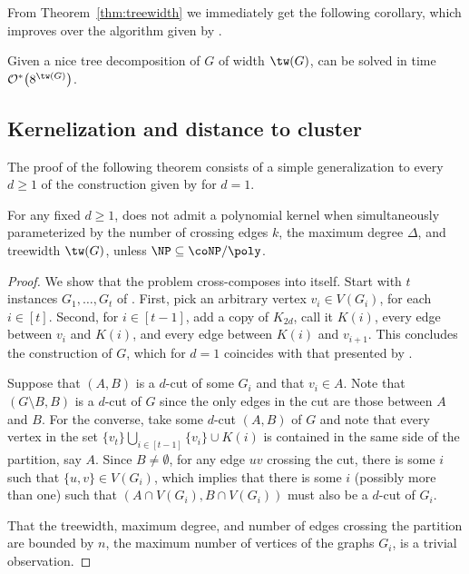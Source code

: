 From Theorem~\ref{thm:treewidth} we immediately get the following corollary, which improves over the algorithm given by \cite{matching_cut_structural}.

\begin{corollary}
   Given a nice tree decomposition of $G$ of width $\tw(G)$,  can be solved in time  $\bigOs{8^{\tw(G)}}$.
\end{corollary}

\subsection{Kernelization and distance to cluster}
\label{sec:kernelization}

The proof of the following theorem consists of a simple generalization to every $d \geq 1$ of the construction given by \cite{matching_cut_ipec}  for $d=1$.

\begin{theorem}\label{thm:no-kernel}
    For any fixed $d \geq 1$,  does not admit a polynomial kernel when simultaneously parameterized by the number of crossing edges $k$, the maximum degree $\Delta$, and treewidth $\tw(G)$, unless $\NP \subseteq \coNP/\poly$.
\end{theorem}

\begin{proof}
    We show that the problem cross-composes into itself.
    Start with $t$ instances $G_1, \dots, G_t$ of .
    First, pick an arbitrary vertex $v_i \in V(G_i)$, for each $i \in [t]$.
    Second, for $i \in [t-1]$,  add a copy of $K_{2d}$, call it $K(i)$, every edge between $v_i$ and $K(i)$, and every edge between $K(i)$ and $v_{i+1}$.
    This concludes the construction of $G$, which  for $d=1$ coincides with that presented by \cite{matching_cut_ipec}.

    Suppose that $(A, B)$ is a $d$-cut of some $G_i$ and that $v_i \in A$.
    Note that $(G \setminus B, B)$ is a $d$-cut of $G$ since the only edges in the cut are those between $A$ and $B$.
    For the converse, take some $d$-cut $(A, B)$ of $G$ and note that every vertex in the set $\{v_t\} \bigcup_{i \in [t-1]}\{v_i\} \cup K(i)$ is contained in the same side of the partition, say $A$.
    Since $B \neq \emptyset$, for any edge $uv$ crossing the cut, there is some $i$ such that $\{u,v\} \in V(G_i)$, which implies that there is some $i$ (possibly more than one) such that $(A \cap V(G_i), B \cap V(G_i))$ must also be a $d$-cut of $G_i$.

    That the treewidth, maximum degree, and number of edges crossing the partition are bounded by $n$, the maximum number of vertices of the graphs $G_i$, is a trivial observation.
\end{proof}

